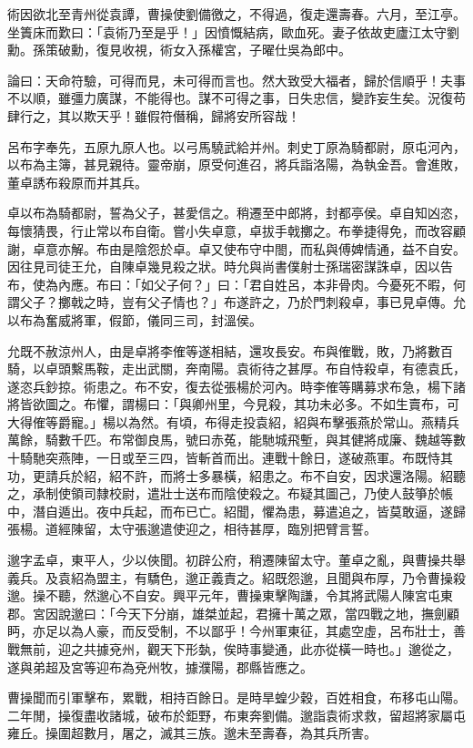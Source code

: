 \begin{pinyinscope}
術因欲北至青州從袁譚，曹操使劉備徼之，不得過，復走還壽春。六月，至江亭。坐簀床而歎曰：「袁術乃至是乎！」因憤慨結病，歐血死。妻子依故吏廬江太守劉勳。孫策破勳，復見收視，術女入孫權宮，子曜仕吳為郎中。

論曰：天命符驗，可得而見，未可得而言也。然大致受大福者，歸於信順乎！夫事不以順，雖彊力廣謀，不能得也。謀不可得之事，日失忠信，變詐妄生矣。況復苟肆行之，其以欺天乎！雖假符僭稱，歸將安所容哉！

呂布字奉先，五原九原人也。以弓馬驍武給并州。刺史丁原為騎都尉，原屯河內，以布為主簿，甚見親待。靈帝崩，原受何進召，將兵詣洛陽，為執金吾。會進敗，董卓誘布殺原而并其兵。

卓以布為騎都尉，誓為父子，甚愛信之。稍遷至中郎將，封都亭侯。卓自知凶恣，每懷猜畏，行止常以布自衛。嘗小失卓意，卓拔手戟擲之。布拳捷得免，而改容顧謝，卓意亦解。布由是陰怨於卓。卓又使布守中閤，而私與傅婢情通，益不自安。因往見司徒王允，自陳卓幾見殺之狀。時允與尚書僕射士孫瑞密謀誅卓，因以告布，使為內應。布曰：「如父子何？」曰：「君自姓呂，本非骨肉。今憂死不暇，何謂父子？擲戟之時，豈有父子情也？」布遂許之，乃於門刺殺卓，事已見卓傳。允以布為奮威將軍，假節，儀同三司，封溫侯。

允既不赦涼州人，由是卓將李傕等遂相結，還攻長安。布與傕戰，敗，乃將數百騎，以卓頭繫馬鞍，走出武關，奔南陽。袁術待之甚厚。布自恃殺卓，有德袁氏，遂恣兵鈔掠。術患之。布不安，復去從張楊於河內。時李傕等購募求布急，楊下諸將皆欲圖之。布懼，謂楊曰：「與卿州里，今見殺，其功未必多。不如生賣布，可大得傕等爵寵。」楊以為然。有頃，布得走投袁紹，紹與布擊張燕於常山。燕精兵萬餘，騎數千匹。布常御良馬，號曰赤菟，能馳城飛塹，與其健將成廉、魏越等數十騎馳突燕陣，一日或至三四，皆斬首而出。連戰十餘日，遂破燕軍。布既恃其功，更請兵於紹，紹不許，而將士多暴橫，紹患之。布不自安，因求還洛陽。紹聽之，承制使領司隸校尉，遣壯士送布而陰使殺之。布疑其圖己，乃使人鼓箏於帳中，潛自遁出。夜中兵起，而布已亡。紹聞，懼為患，募遣追之，皆莫敢逼，遂歸張楊。道經陳留，太守張邈遣使迎之，相待甚厚，臨別把臂言誓。

邈字孟卓，東平人，少以俠聞。初辟公府，稍遷陳留太守。董卓之亂，與曹操共舉義兵。及袁紹為盟主，有驕色，邈正義責之。紹既怨邈，且聞與布厚，乃令曹操殺邈。操不聽，然邈心不自安。興平元年，曹操東擊陶謙，令其將武陽人陳宮屯東郡。宮因說邈曰：「今天下分崩，雄桀並起，君擁十萬之眾，當四戰之地，撫劍顧眄，亦足以為人豪，而反受制，不以鄙乎！今州軍東征，其處空虛，呂布壯士，善戰無前，迎之共據兗州，觀天下形埶，俟時事變通，此亦從橫一時也。」邈從之，遂與弟超及宮等迎布為兗州牧，據濮陽，郡縣皆應之。

曹操聞而引軍擊布，累戰，相持百餘日。是時旱蝗少穀，百姓相食，布移屯山陽。二年閒，操復盡收諸城，破布於鉅野，布東奔劉備。邈詣袁術求救，留超將家屬屯雍丘。操圍超數月，屠之，滅其三族。邈未至壽春，為其兵所害。


\end{pinyinscope}
